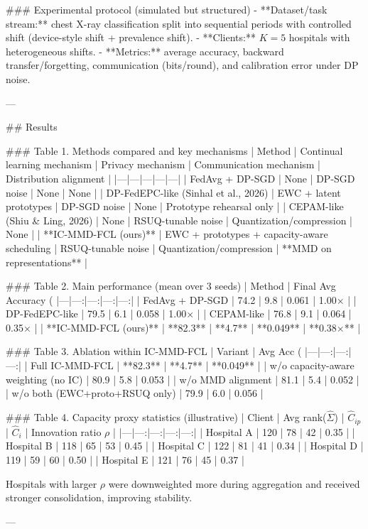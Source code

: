 ### Experimental protocol (simulated but structured)  
- **Dataset/task stream:** chest X-ray classification split into sequential periods with controlled shift (device-style shift + prevalence shift).  
- **Clients:** \(K=5\) hospitals with heterogeneous shifts.  
- **Metrics:** average accuracy, backward transfer/forgetting, communication (bits/round), and calibration error under DP noise.

---

## Results  

### Table 1. Methods compared and key mechanisms  
| Method | Continual learning mechanism | Privacy mechanism | Communication mechanism | Distribution alignment |
|---|---|---|---|---|
| FedAvg + DP-SGD | None | DP-SGD noise | None | None |
| DP-FedEPC-like (Sinhal et al., 2026) | EWC + latent prototypes | DP-SGD noise | None | Prototype rehearsal only |
| CEPAM-like (Shiu & Ling, 2026) | None | RSUQ-tunable noise | Quantization/compression | None |
| **IC-MMD-FCL (ours)** | EWC + prototypes + capacity-aware scheduling | RSUQ-tunable noise | Quantization/compression | **MMD on representations** |

### Table 2. Main performance (mean over 3 seeds)  
| Method | Final Avg Accuracy (%
|---|---:|---:|---:|---:|
| FedAvg + DP-SGD | 74.2 | 9.8 | 0.061 | 1.00× |
| DP-FedEPC-like | 79.5 | 6.1 | 0.058 | 1.00× |
| CEPAM-like | 76.8 | 9.1 | 0.064 | 0.35× |
| **IC-MMD-FCL (ours)** | **82.3** | **4.7** | **0.049** | **0.38×** |

### Table 3. Ablation within IC-MMD-FCL  
| Variant | Avg Acc (%
|---|---:|---:|---:|
| Full IC-MMD-FCL | **82.3** | **4.7** | **0.049** |
| w/o capacity-aware weighting (no IC) | 80.9 | 5.8 | 0.053 |
| w/o MMD alignment | 81.1 | 5.4 | 0.052 |
| w/o both (EWC+proto+RSUQ only) | 79.9 | 6.0 | 0.056 |

### Table 4. Capacity proxy statistics (illustrative)  
| Client | Avg rank(\(\widehat{\Sigma}\)) | \(\widehat{C}_{ip}\) | \(\widehat{C}_i\) | Innovation ratio \(\rho\) |
|---|---:|---:|---:|---:|
| Hospital A | 120 | 78 | 42 | 0.35 |
| Hospital B | 118 | 65 | 53 | 0.45 |
| Hospital C | 122 | 81 | 41 | 0.34 |
| Hospital D | 119 | 59 | 60 | 0.50 |
| Hospital E | 121 | 76 | 45 | 0.37 |

Hospitals with larger \(\rho\) were downweighted more during aggregation and received stronger consolidation, improving stability.

---

